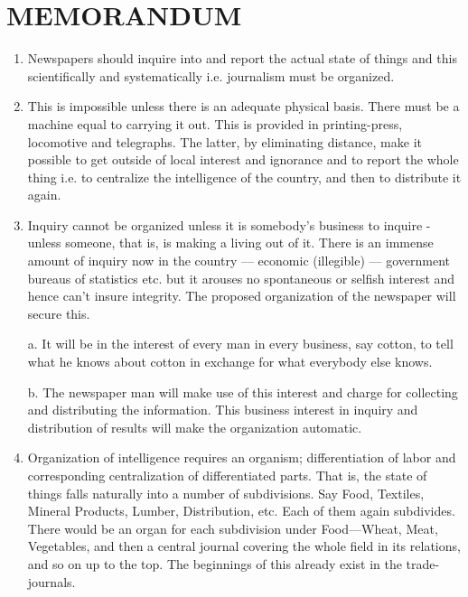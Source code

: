\documentclass[twoside,symmetric,nobib,justified]{tufte-book}
\begin{document}
\vspace{.2in}

\begin{LARGE}
    

\end{LARGE}

\vspace{0.5in}


    

\hypertarget{memorandum}{%
\section{MEMORANDUM}\label{memorandum}}

\begin{enumerate}


    \item Newspapers
 should inquire into and report the actual state of things
and this scientifically and systematically i.e. journalism must be
organized.

    \item This is impossible unless there is an adequate physical basis. There
must be a machine equal to carrying it out. This is provided in
printing-press, locomotive and telegraphs. The latter, by eliminating
distance, make it possible to get outside of local interest and
ignorance and to report the whole thing i.e. to centralize the
intelligence of the country, and then to distribute it again.

    \item Inquiry cannot be organized unless it is somebody's business to
inquire - unless someone, that is, is making a living out of it. There
is an immense amount of inquiry now in the country --- economic
(illegible) --- government bureaus of statistics etc. but it arouses no
spontaneous or selfish interest and hence can't insure integrity. The
proposed organization of the newspaper will secure this.

a. It will be in the interest of every man in every business, say
cotton, to tell what he knows about cotton in exchange for what
everybody else knows.

b. The newspaper man will make use of this interest and charge for
collecting and distributing the information. This business interest in
inquiry and distribution of results will make the organization
automatic.

\item Organization of intelligence requires an organism; differentiation of
labor and corresponding centralization of differentiated parts. That is,
the state of things falls naturally into a number of subdivisions. Say
Food, Textiles, Mineral Products, Lumber, Distribution, etc. Each of
them again subdivides. There would be an organ for each subdivision
under Food---Wheat, Meat, Vegetables, and then a central journal
covering the whole field in its relations, and so on up to the top. The
beginnings of this already exist in the trade-journals.


\end{enumerate}
\end{document}
